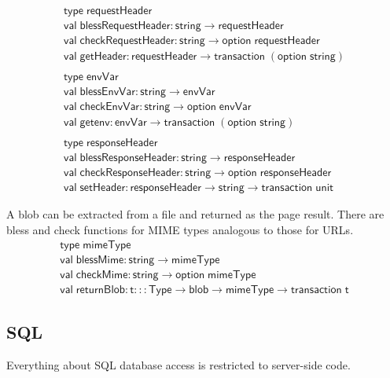 \documentclass{article}
\newcommand{\mt}[1]{\mathsf{#1}}
\begin{document}
$$\begin{array}{l}
  \mt{type} \; \mt{requestHeader} \\
  \mt{val} \; \mt{blessRequestHeader} : \mt{string} \to \mt{requestHeader} \\
  \mt{val} \; \mt{checkRequestHeader} : \mt{string} \to \mt{option} \; \mt{requestHeader} \\
  \mt{val} \; \mt{getHeader} : \mt{requestHeader} \to \mt{transaction} \; (\mt{option} \; \mt{string}) \\
  \\
  \mt{type} \; \mt{envVar} \\
  \mt{val} \; \mt{blessEnvVar} : \mt{string} \to \mt{envVar} \\
  \mt{val} \; \mt{checkEnvVar} : \mt{string} \to \mt{option} \; \mt{envVar} \\
  \mt{val} \; \mt{getenv} : \mt{envVar} \to \mt{transaction} \; (\mt{option} \; \mt{string}) \\
  \\
  \mt{type} \; \mt{responseHeader} \\
  \mt{val} \; \mt{blessResponseHeader} : \mt{string} \to \mt{responseHeader} \\
  \mt{val} \; \mt{checkResponseHeader} : \mt{string} \to \mt{option} \; \mt{responseHeader} \\
  \mt{val} \; \mt{setHeader} : \mt{responseHeader} \to \mt{string} \to \mt{transaction} \; \mt{unit}
\end{array}$$

A blob can be extracted from a file and returned as the page result.  There are bless and check functions for MIME types analogous to those for URLs.
$$\begin{array}{l}
  \mt{type} \; \mt{mimeType} \\
  \mt{val} \; \mt{blessMime} : \mt{string} \to \mt{mimeType} \\
  \mt{val} \; \mt{checkMime} : \mt{string} \to \mt{option} \; \mt{mimeType} \\
  \mt{val} \; \mt{returnBlob} : \mt{t} ::: \mt{Type} \to \mt{blob} \to \mt{mimeType} \to \mt{transaction} \; \mt{t}
\end{array}$$

\subsection{SQL}

Everything about SQL database access is restricted to server-side code.
\end{document}
